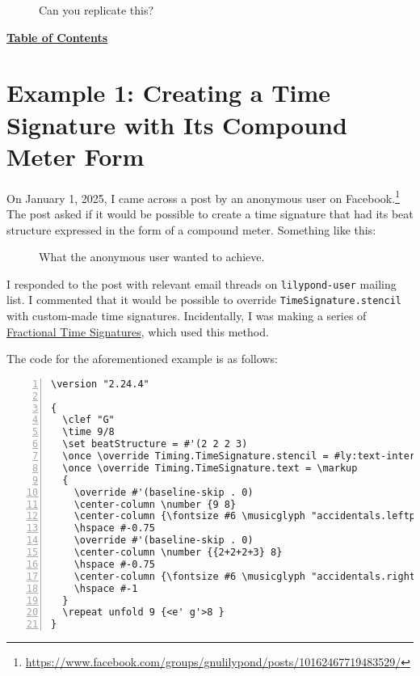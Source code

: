 	\begin{figure}[!htb]
	\centering
{}
	\caption{\label{fig:figure4} Can you replicate this?}
	\end{figure}
\vfill \break
\hyperref[sec:toc]{\textbf{Table of Contents}}

\vfill \break


\section {Example 1: Creating a Time Signature with Its Compound Meter Form}

On January 1, 2025, I came across a post by an anonymous user on Facebook.\footnote{\url{https://www.facebook.com/groups/gnulilypond/posts/10162467719483529/}} The post asked if it would be possible to create a time signature that had its beat structure expressed in the form of a compound meter. Something like this:

\begin{figure}[!htb]
\centering
{}
\caption{\label{fig:figure5} What the anonymous user wanted to achieve.}
\end{figure}

I responded to the post with relevant email threads on \verb|lilypond-user| mailing list. I commented that it would be possible to override \verb|TimeSignature.stencil| with custom-made time signatures. Incidentally, I was making a series of \hyperref[sec:time_signatures]{Fractional Time Signatures}, which used this method. 

The code for the aforementioned example is as follows:
\begin{Verbatim}[numbers=left,xleftmargin=5mm]
\version "2.24.4"

{
  \clef "G"
  \time 9/8
  \set beatStructure = #'(2 2 2 3)
  \once \override Timing.TimeSignature.stencil = #ly:text-interface::print
  \once \override Timing.TimeSignature.text = \markup
  {
    \override #'(baseline-skip . 0)
    \center-column \number {9 8}
    \center-column {\fontsize #6 \musicglyph "accidentals.leftparen"}
    \hspace #-0.75
    \override #'(baseline-skip . 0)
    \center-column \number {{2+2+2+3} 8}
    \hspace #-0.75
    \center-column {\fontsize #6 \musicglyph "accidentals.rightparen"}
    \hspace #-1
  }
  \repeat unfold 9 {<e' g'>8 }
}
\end{Verbatim}

